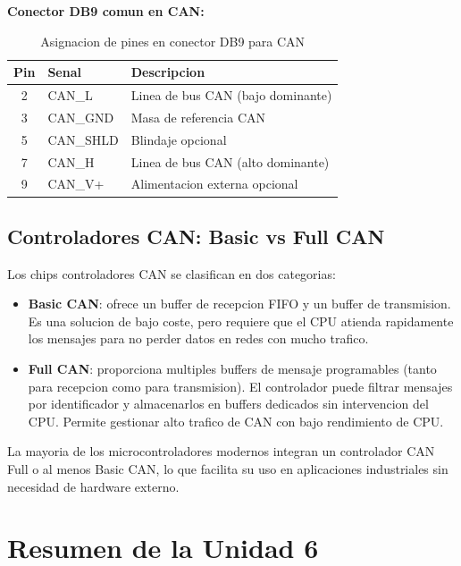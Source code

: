 \textbf{Conector DB9 comun en CAN:}

\begin{table}[H]
    \centering
    \caption{Asignacion de pines en conector DB9 para CAN}
    \label{tab:can_db9}
    \begin{tabular}{|c|l|l|}
        \hline
        \textbf{Pin} & \textbf{Senal} & \textbf{Descripcion} \\
        \hline
        2 & CAN\_L & Linea de bus CAN (bajo dominante) \\
        \hline
        3 & CAN\_GND & Masa de referencia CAN \\
        \hline
        5 & CAN\_SHLD & Blindaje opcional \\
        \hline
        7 & CAN\_H & Linea de bus CAN (alto dominante) \\
        \hline
        9 & CAN\_V+ & Alimentacion externa opcional \\
        \hline
    \end{tabular}
\end{table}

\subsection{Controladores CAN: Basic vs Full CAN}

Los chips controladores CAN se clasifican en dos categorias:

\begin{itemize}
    \item \textbf{Basic CAN}: ofrece un buffer de recepcion FIFO y un buffer de
    transmision. Es una solucion de bajo coste, pero requiere que el CPU atienda
    rapidamente los mensajes para no perder datos en redes con mucho trafico.
    \item \textbf{Full CAN}: proporciona multiples buffers de mensaje programables
    (tanto para recepcion como para transmision). El controlador puede filtrar
    mensajes por identificador y almacenarlos en buffers dedicados sin
    intervencion del CPU. Permite gestionar alto trafico de CAN con bajo
    rendimiento de CPU.
\end{itemize}

La mayoria de los microcontroladores modernos integran un controlador CAN Full
o al menos Basic CAN, lo que facilita su uso en aplicaciones industriales sin
necesidad de hardware externo.

\section{Resumen de la Unidad 6}

